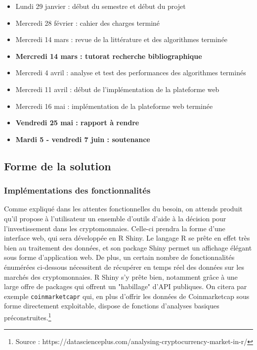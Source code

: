 \documentclass[a4paper]{article}
\begin{document}
\begin{itemize}
    \item Lundi 29 janvier : début du semestre et début du projet
    \item Mercredi 28 février : cahier des charges terminé
    \item Mercredi 14 mars : revue de la littérature et des algorithmes terminée
    \item \textbf{Mercredi 14 mars : tutorat recherche bibliographique}
    \item Mercredi 4 avril : analyse et test des performances des algorithmes terminés
    \item Mercredi 11 avril : début de l'implémentation de la plateforme web
    \item Mercredi 16 mai : implémentation de la plateforme web terminée
    \item \textbf{Vendredi 25 mai : rapport à rendre}
    \item \textbf{Mardi 5 - vendredi 7 juin : soutenance}
\end{itemize}

\subsection{Forme de la solution}

\subsubsection{Implémentations des fonctionnalités}

Comme expliqué dans les attentes fonctionnelles du besoin, on attends produit qu'il propose à l'utilisateur un ensemble d'outils d'aide à la décision pour l'investissement dans les cryptomonnaies. Celle-ci prendra la forme d'une interface web, qui sera développée en R Shiny. Le langage R se prête en effet très bien au traitement des données, et son package Shiny permet un affichage élégant sous forme d'application web. De plus, un certain nombre de fonctionnalités énumérées ci-dessous nécessitent de récupérer en temps réel des données sur les marchés des cryptomonnaies. R Shiny s'y prête bien, notamment grâce à une large offre de packages qui offrent un "habillage" d'API publiques. On citera par exemple \texttt{coinmarketcapr} qui, en plus d'offrir les données de Coinmarketcap sous forme directement exploitable, dispose de fonctions d'analyses basiques préconstruites.\footnote{Source : https://datascienceplus.com/analysing-cryptocurrency-market-in-r/} 
\end{document}
